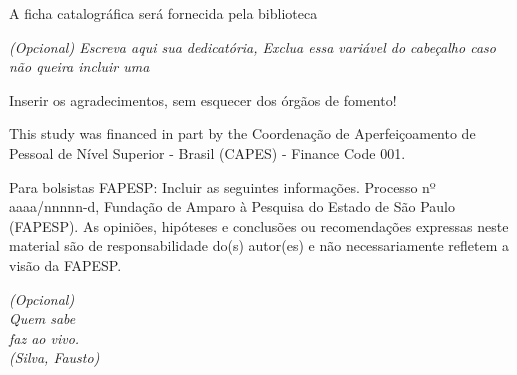 \documentclass[
	oldfontcommands,
	sumario=abnt-6027-2012,
	12pt,
	openright,
	oneside,
	a4paper,
	english,
	english
	]{imecc-unicamp}
\begin{document}
\frenchspacing

\pretextual
\imprimirprimeirafolha

  \imprimirfolhaderosto

\begin{fichacatalografica}
      \begin{center}
  {\ABNTEXchapterfont\large A ficha catalográfica será fornecida pela biblioteca}
    \end{center}
  \end{fichacatalografica}

\begin{folhadeaprovacao}
  \end{folhadeaprovacao}

  \begin{dedicatoria}
     \vspace*{\fill}
     \centering
     \noindent
     \textit{
        (Opcional) Escreva aqui sua dedicatória, Exclua essa variável do
        cabeçalho caso não queira incluir uma
     }
     \vspace*{\fill}
  \end{dedicatoria}

  \begin{agradecimentos}
  Inserir os agradecimentos, sem esquecer dos órgãos de fomento!

  This study was financed in part by the Coordenação de Aperfeiçoamento
  de Pessoal de Nível Superior - Brasil (CAPES) - Finance Code 001.

  Para bolsistas FAPESP: Incluir as seguintes informações. Processo nº
  aaaa/nnnnn-d, Fundação de Amparo à Pesquisa do Estado de São Paulo
  (FAPESP). As opiniões, hipóteses e conclusões ou recomendações
  expressas neste material são de responsabilidade do(s) autor(es) e não
  necessariamente refletem a visão da FAPESP.
  \end{agradecimentos}

  \begin{epigrafe}
      \vspace*{\fill}
      \begin{flushright}
  	\textit{(Opcional)\\
Quem sabe\\
faz ao vivo.\\
(Silva, Fausto)}
      \end{flushright}
  \end{epigrafe}
  
\end{document}
